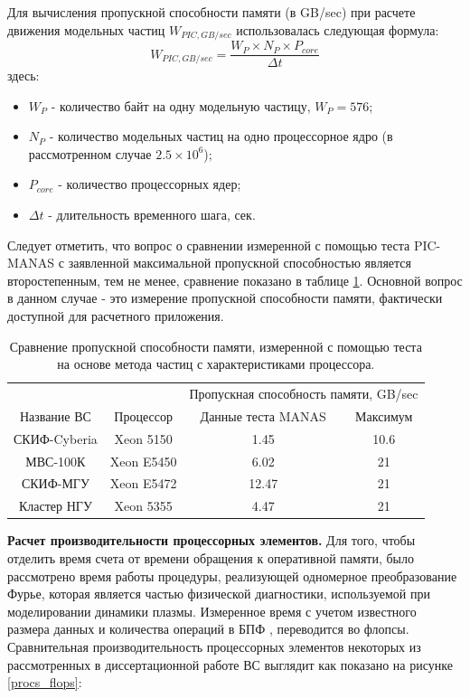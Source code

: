 Для вычисления пропускной способности памяти (в GB/sec) при расчете движения модельных частиц $W_{PIC,GB/sec}$ использовалась следующая формула:
\begin{equation}
W_{PIC,GB/sec} = \frac{W_P\times N_P \times P_{core}}{\Delta t}
\label{RAM_performance}
\end{equation}
здесь:
\begin{itemize}
	\item $W_P$ - количество байт на одну модельную частицу, $W_P = 576$;
	\item $N_P$ - количество модельных частиц на одно процессорное ядро (в рассмотренном случае $2.5\times 10^6$);  
	\item $P_{core}$ - количество процессорных ядер;
	\item $\Delta t$  - длительность временного шага, сек.
\end{itemize}	

Следует отметить, что вопрос о сравнении измеренной с помощью теста PIC-MANAS с заявленной максимальной пропускной способностью 
является второстепенным, тем не менее, сравнение показано в таблице \ref{throu_PIC_vs_PROC_RAM}. Основной вопрос в данном случае - это измерение пропускной способности памяти,  фактически доступной для расчетного приложения.

\begin{table}[ht]
	\caption{Сравнение пропускной способности памяти, измеренной с помощью теста на основе метода частиц с характеристиками процессора.}
	\label{throu_PIC_vs_PROC_RAM}
	\begin{tabular}{|c|c|c|c|}
		\hline
		&            & \multicolumn{2}{|c|}{Пропускная способность памяти, GB/sec} \\ \cline{3-4}  	
		Название ВС  & Процессор  & Данные теста MANAS & Максимум \\ \hline
		СКИФ-Cyberia & Xeon 5150  &     1.45           & 10.6     \\ \hline
		МВС-100К     & Xeon E5450 &     6.02           & 21       \\ \hline 
		СКИФ-МГУ     & Xeon E5472 &     12.47          & 21       \\ \hline     
		Кластер НГУ  & Xeon 5355  &     4.47           & 21       \\ \hline
	\end{tabular}	
\end{table}


\textbf{Расчет производительности процессорных элементов.}
Для того, чтобы отделить время счета от времени обращения к оперативной памяти, было рассмотрено время работы процедуры,
реализующей одномерное преобразование Фурье, которая является частью физической диагностики, используемой при моделировании динамики плазмы. Измеренное время с учетом известного размера данных и количества операций в БПФ \cite{FFT_OVS}, переводится во флопсы. Сравнительная производительность процессорных элементов некоторых из рассмотренных в диссертационной работе ВС выглядит как показано на рисунке  \ref{procs_flops}:

